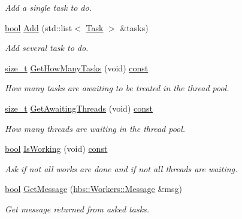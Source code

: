 \begin{DoxyCompactItemize}
\begin{DoxyCompactList}\small\item\em Add a single task to do. \end{DoxyCompactList}\item 
\hyperlink{term__entry_8h_a002004ba5d663f149f6c38064926abac}{bool} \hyperlink{classhbs_1_1_workers_a6027768ad2ec5ae569353fbe228b3d00}{Add} (std\-::list$<$ \hyperlink{classhbs_1_1_workers_a451e0985676c46558a1114b12dd96916}{Task} $>$ \&tasks)
\begin{DoxyCompactList}\small\item\em Add several task to do. \end{DoxyCompactList}\item 
\hyperlink{nc__alloc_8h_a7b60c5629e55e8ec87a4547dd4abced4}{size\-\_\-t} \hyperlink{classhbs_1_1_workers_aedd820365d89c79024ef322daab1f62b}{Get\-How\-Many\-Tasks} (void) \hyperlink{term__entry_8h_a57bd63ce7f9a353488880e3de6692d5a}{const} 
\begin{DoxyCompactList}\small\item\em How many tasks are awaiting to be treated in the thread pool. \end{DoxyCompactList}\item 
\hyperlink{nc__alloc_8h_a7b60c5629e55e8ec87a4547dd4abced4}{size\-\_\-t} \hyperlink{classhbs_1_1_workers_a65cb78bc4bc0aefbb1e3f0ee23d223c5}{Get\-Awaiting\-Threads} (void) \hyperlink{term__entry_8h_a57bd63ce7f9a353488880e3de6692d5a}{const} 
\begin{DoxyCompactList}\small\item\em How many threads are waiting in the thread pool. \end{DoxyCompactList}\item 
\hyperlink{term__entry_8h_a002004ba5d663f149f6c38064926abac}{bool} \hyperlink{classhbs_1_1_workers_a0cc4e512f1f50f0496384e2456e0d53b}{Is\-Working} (void) \hyperlink{term__entry_8h_a57bd63ce7f9a353488880e3de6692d5a}{const} 
\begin{DoxyCompactList}\small\item\em Ask if not all works are done and if not all threads are waiting. \end{DoxyCompactList}\item 
\hyperlink{term__entry_8h_a002004ba5d663f149f6c38064926abac}{bool} \hyperlink{classhbs_1_1_workers_ab719a793adce960a24611cf5d3f80f4e}{Get\-Message} (\hyperlink{classhbs_1_1_workers_addd8065047a1fa376581419ffcda0685}{hbs\-::\-Workers\-::\-Message} \&msg)
\begin{DoxyCompactList}\small\item\em Get message returned from asked tasks. \end{DoxyCompactList}\item 

\end{DoxyCompactItemize}
